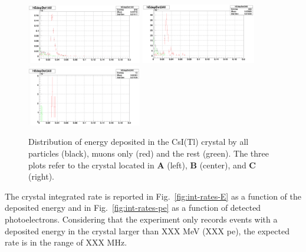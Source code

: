 \begin{figure}[h!] 
\center
\includegraphics[width=5.0cm]{figs/Edep1.pdf}
\includegraphics[width=5.0cm]{figs/Edep2.pdf}
\includegraphics[width=5.0cm]{figs/Edep3.pdf}
\caption {Distribution of energy deposited in the CsI(Tl) crystal by all particles (black), muons only (red) and the rest (green). The three plots refer to the crystal located in {\bf A} (left),  {\bf B} (center), and {\bf C} (right).}
\label{fig:edep}
\end{figure}
The crystal  integrated rate is reported in Fig.~\ref{fig:int-rates-E}  as a function of the deposited energy  and in Fig.~\ref{fig:int-rates-pe}  as a function of detected photoelectrons. Considering that  the experiment only records events 
with a deposited energy in the crystal  larger than  XXX MeV (XXX pe), the expected rate is in the range of XXX MHz.
